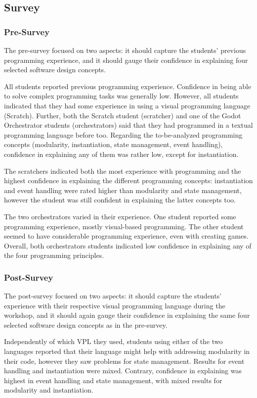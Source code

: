 \subsection{Survey}

\subsubsection{Pre-Survey}
The pre-survey focused on two aspects: it should capture the students' previous programming experience, and it should gauge their confidence in explaining four selected software design concepts.

All students reported previous programming experience.
Confidence in being able to solve complex programming tasks was generally low.
However, all students indicated that they had some experience in using a visual programming language (Scratch).
Further, both the Scratch student (scratcher) and one of the Godot Orchestrator students  (orchestrators) said that they had programmed in a textual programming language before too.
Regarding the to-be-analyzed programming concepts (modularity, instantiation, state management, event handling), confidence in explaining any of them was rather low, except for instantiation.

The scratchers indicated both the most experience with programming and the highest confidence in explaining the different programming concepts: instantiation and event handling were rated higher than modularity and state management, however the student was still confident in explaining the latter concepts too.

The two orchestrators varied in their experience.
One student reported some programming experience, mostly visual-based programming.
The other student seemed to have considerable programming experience, even with creating games.
Overall, both orchestrators students indicated low confidence in explaining any of the four programming principles.

\subsubsection{Post-Survey}
The post-survey focused on two aspects: it should capture the students' experience with their respective visual programming language during the workshop, and it should again gauge their confidence in explaining the same four selected software design concepts as in the pre-survey.

Independently of which VPL they used, students using either of the two languages reported that their language might help with addressing modularity in their code, however they saw problems for state management.
Results for event handling and instantiation were mixed.
Contrary, confidence in explaining was highest in event handling and state management, with mixed results for modularity and instantiation.

